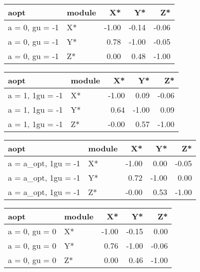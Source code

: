 \documentclass[10pt,a4paper]{article}
\begin{document}
\begin{table}[ht]
\centering
\begin{tabular}{llrrr}
  \hline
aopt & module & X* & Y* & Z* \\ 
  \hline
a = 0, gu = -1 & X* & -1.00 & -0.14 & -0.06 \\ 
  a = 0, gu = -1 & Y* & 0.78 & -1.00 & -0.05 \\ 
  a = 0, gu = -1 & Z* & 0.00 & 0.48 & -1.00 \\ 
   \hline
\end{tabular}
\end{table}


\begin{table}[ht]
\centering
\begin{tabular}{llrrr}
  \hline
aopt & module & X* & Y* & Z* \\ 
  \hline
a = 1, 1gu = -1 & X* & -1.00 & 0.09 & -0.06 \\ 
  a = 1, 1gu = -1 & Y* & 0.64 & -1.00 & 0.09 \\ 
  a = 1, 1gu = -1 & Z* & -0.00 & 0.57 & -1.00 \\ 
   \hline
\end{tabular}
\end{table}


\begin{table}[ht]
\centering
\begin{tabular}{llrrr}
  \hline
aopt & module & X* & Y* & Z* \\ 
  \hline
a = a\_opt, 1gu = -1 & X* & -1.00 & 0.00 & -0.05 \\ 
  a = a\_opt, 1gu = -1 & Y* & 0.72 & -1.00 & 0.00 \\ 
  a = a\_opt, 1gu = -1 & Z* & -0.00 & 0.53 & -1.00 \\ 
   \hline
\end{tabular}
\end{table}


\begin{table}[ht]
\centering
\begin{tabular}{llrrr}
  \hline
aopt & module & X* & Y* & Z* \\ 
  \hline
a = 0, gu = 0 & X* & -1.00 & -0.15 & 0.00 \\ 
  a = 0, gu = 0 & Y* & 0.76 & -1.00 & -0.06 \\ 
  a = 0, gu = 0 & Z* & 0.00 & 0.46 & -1.00 \\ 
   \hline
\end{tabular}
\end{table}
\end{document}

